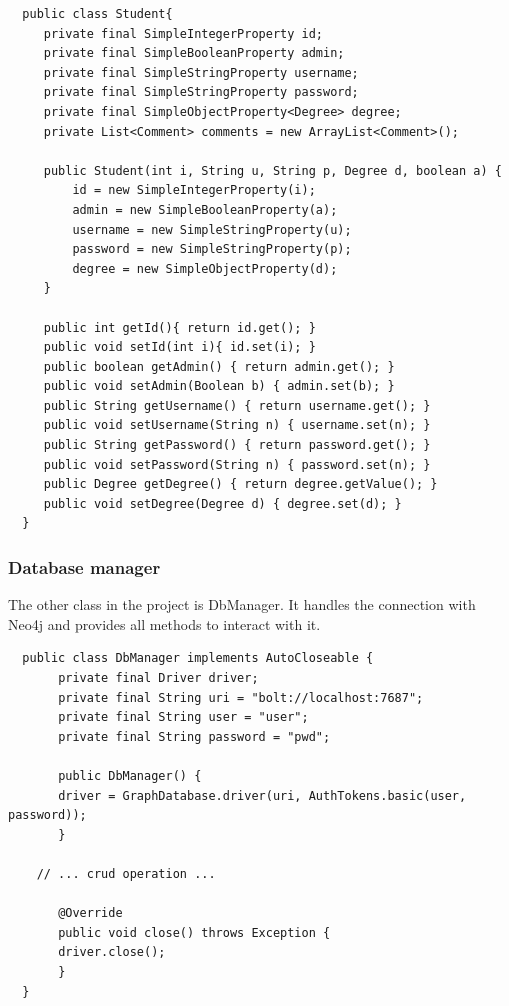 \documentclass[a4paper]{article}
\begin{document}
\begin{verbatim}
  public class Student{
     private final SimpleIntegerProperty id;
     private final SimpleBooleanProperty admin;
     private final SimpleStringProperty username;
     private final SimpleStringProperty password;
     private final SimpleObjectProperty<Degree> degree;
     private List<Comment> comments = new ArrayList<Comment>();
    
     public Student(int i, String u, String p, Degree d, boolean a) {
         id = new SimpleIntegerProperty(i);
         admin = new SimpleBooleanProperty(a);
         username = new SimpleStringProperty(u);
         password = new SimpleStringProperty(p);
         degree = new SimpleObjectProperty(d);		
     }
    
     public int getId(){ return id.get(); }
     public void setId(int i){ id.set(i); }
     public boolean getAdmin() { return admin.get(); }
     public void setAdmin(Boolean b) { admin.set(b); }
     public String getUsername() { return username.get(); }
     public void setUsername(String n) { username.set(n); }
     public String getPassword() { return password.get(); }
     public void setPassword(String n) { password.set(n); }
     public Degree getDegree() { return degree.getValue(); }
     public void setDegree(Degree d) { degree.set(d); }
  }
\end{verbatim}

\subsubsection{Database manager}
The other class in the project is DbManager. It handles the connection with Neo4j and provides all methods to interact with it.

\begin{verbatim}
  public class DbManager implements AutoCloseable {
       private final Driver driver;
       private final String uri = "bolt://localhost:7687";
       private final String user = "user";
       private final String password = "pwd";

       public DbManager() {
       driver = GraphDatabase.driver(uri, AuthTokens.basic(user, password));
       }

    // ... crud operation ...

       @Override
       public void close() throws Exception {
       driver.close();
       }
  }
\end{verbatim}


\end{document}
